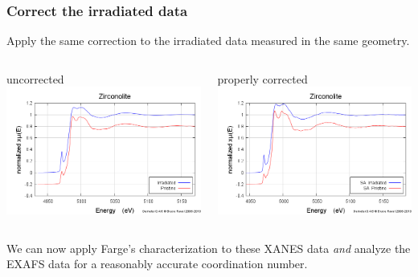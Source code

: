 \documentclass[10pt, xcolor=x11names, compress, handout]{beamer}
\begin{document}
\begin{frame}
  \frametitle{Correct the irradiated data}
  Apply the same correction to the irradiated data measured in the same geometry.
  \begin{columns}
    \begin{column}{0.5\linewidth}
      \begin{center}
        uncorrected\\
        \includegraphics[width=0.8\linewidth]{images/pristine_irrad.png}
      \end{center}
    \end{column}
    \begin{column}{0.5\linewidth}
      \begin{center}
        properly corrected\\
        \includegraphics[width=0.8\linewidth]{images/zirconolite_fixed.png}
      \end{center}
    \end{column}
  \end{columns}

  \bigskip

  We can now apply Farge's characterization to these XANES data
  \textit{and} analyze the EXAFS data for a reasonably accurate
  coordination number.


\end{frame}
\end{document}
